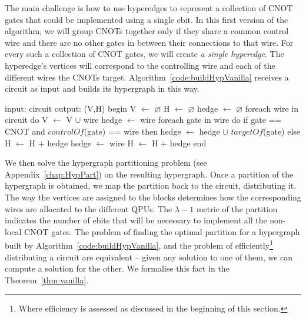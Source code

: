 The main challenge is how to use hyperedges to represent a collection of CNOT gates that could be implemented using a single ebit. In this first version of the algorithm, we will group CNOTs together only if they share a common control wire and there are no other gates in between their connections to that wire. For every such a collection of CNOT gates, we will create \textit{a single hyperedge}. The hyperedge's vertices will correspond to the controlling wire and each of the different wires the CNOTs target. Algorithm~\ref{code:buildHypVanilla} receives a circuit as input and builds its hypergraph in this way. 

\begin{algorithm}[caption={Builds the hypergraph of a given circuit. \(H\) may contain multiple hyperedges connecting the same vertices. This algorithm runs in time \(O(g)\), where \(g\) is the number of gates in the input circuit.}, label={code:buildHypVanilla}]
input: circuit
output: (V,H)
begin
  V $\gets$ $\varnothing$
  H $\gets$ $\varnothing$
  hedge $\gets$ $\varnothing$
  foreach wire in circuit do
    V $\gets$ V $\cup$ {wire}
    hedge $\gets$ {wire}
    foreach gate in wire do
      if gate == CNOT and $controlOf$(gate) == wire then
        hedge $\gets$ hedge $\cup$ {$targetOf$(gate)}
      else
        H $\gets$ H $+$ {hedge}
        hedge $\gets$ {wire}
    H $\gets$ H $+$ {hedge}
end
\end{algorithm}


We then solve the hypergraph partitioning problem (see Appendix~\ref{chap:HypPart}) on the resulting hypergraph. Once a partition of the hypergraph is obtained, we map the partition back to the circuit, distributing it. The way the vertices are assigned to the blocks determines how the corresponding wires are allocated to the different QPUs. The \(\lambda-1\) metric of the partition indicates the number of ebits that will be necessary to implement all the non-local CNOT gates. The problem of finding the optimal partition for a hypergraph built by Algorithm~\ref{code:buildHypVanilla}, and the problem of efficiently\footnote{Where efficiency is assessed as discussed in the beginning of this section.} distributing a circuit are equivalent -- given any solution to one of them, we can compute a solution for the other. We formalise this fact in the Theorem~\ref{thm:vanilla}. 

